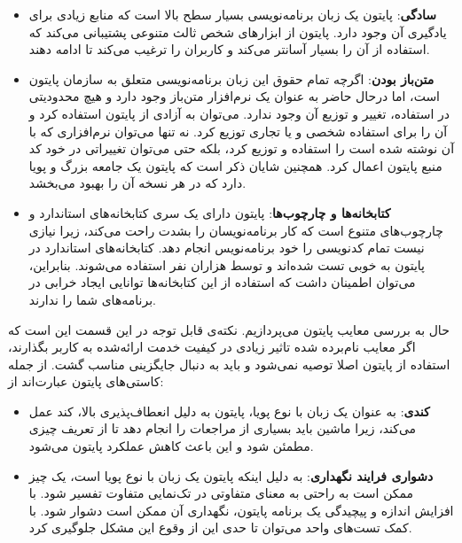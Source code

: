 \begin{itemize}

\item \textbf{سادگی}: پایتون یک زبان برنامه‌نویسی بسیار سطح بالا است که منابع زیادی برای یادگیری آن وجود دارد. پایتون از ابزارهای شخص ثالث متنوعی پشتیبانی می‌کند که استفاده از آن را بسیار آسانتر می‌کند و کاربران را ترغیب می‌کند تا ادامه دهند\cite{srinath2017python, sharma2020python}.

\item \textbf{متن‌باز بودن}: اگرچه تمام حقوق این زبان برنامه‌نویسی متعلق به سازمان پایتون است، اما درحال‌ حاضر به عنوان یک نرم‌افزار متن‌باز وجود دارد و هیچ محدودیتی در استفاده، تغییر و توزیع آن وجود ندارد. می‌توان به آزادی از پایتون استفاده کرد و آن را برای استفاده شخصی و یا تجاری توزیع کرد. نه تنها می‌توان نرم‌افزاری که با آن نوشته شده است را استفاده و توزیع کرد، بلکه حتی می‌توان تغییراتی در خود کد منبع پایتون اعمال کرد. همچنین شایان ذکر است که پایتون یک جامعه بزرگ و پویا دارد که در هر نسخه آن را بهبود می‌بخشد\cite{srinath2017python, sharma2020python}.

\item \textbf{کتابخانه‌ها و چارچوب‌ها}: پایتون دارای یک سری کتابخانه‌های استاندارد و چارچوب‌های متنوع است که کار برنامه‌نویسان را بشدت راحت می‌کند، زیرا نیازی نیست تمام کدنویسی را خود برنامه‌نویس انجام دهد. کتابخانه‌های استاندارد در پایتون به خوبی تست شده‌اند و توسط هزاران نفر استفاده می‌شوند. بنابراین، می‌توان اطمینان داشت که استفاده از این کتابخانه‌ها توانایی ایجاد خرابی در برنامه‌های شما را ندارند\cite{srinath2017python, sharma2020python}.

\end{itemize}

حال به بررسی معایب پایتون می‌پردازیم. نکته‌ی قابل توجه در این قسمت این است که اگر معایب نام‌برده شده تاثیر زیادی در کیفیت خدمت ارائه‌شده به کاربر بگذارند، استفاده از پایتون اصلا توصیه نمی‌شود و باید به دنبال جایگزینی مناسب گشت. از جمله کاستی‌های پایتون عبارت‌اند از:

\begin{itemize}

\item \textbf{کندی}: به عنوان یک زبان با نوع پویا، پایتون به دلیل انعطاف‌پذیری بالا، کند عمل می‌کند، زیرا ماشین باید بسیاری از مراجعات را انجام دهد تا از تعریف چیزی مطمئن شود و این باعث کاهش عملکرد پایتون می‌شود\cite{srinath2017python, sharma2020python}.

\item \textbf{دشواری فرایند نگهداری}: به دلیل اینکه پایتون یک زبان با نوع پویا است، یک چیز ممکن است به راحتی به معنای متفاوتی در تک‌نمایی متفاوت تفسیر شود. با افزایش اندازه و پیچیدگی یک برنامه پایتون، نگهداری آن ممکن است دشوار شود. با کمک تست‌های واحد می‌توان تا حدی این از وقوع این مشکل جلوگیری کرد\cite{srinath2017python, sharma2020python}.

\end{itemize}



